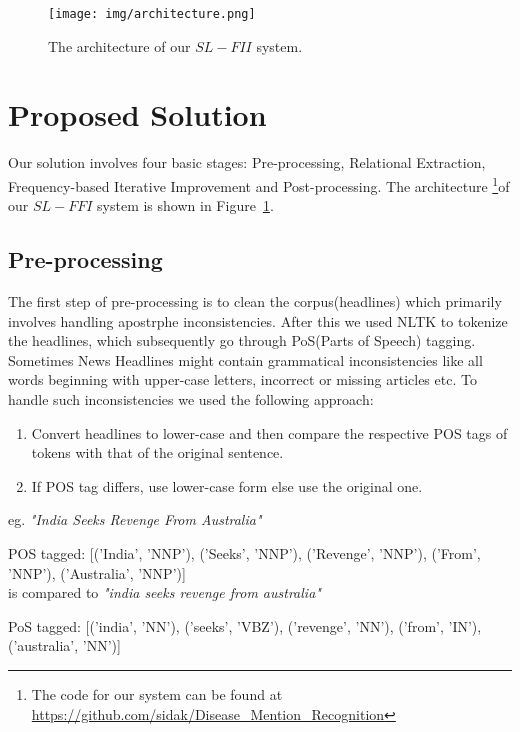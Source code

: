 \documentclass{article}
\begin{document}
\begin{figure}[t]
\centering
\texttt{[image: img/architecture.png]}
\caption{The architecture of our $SL-FII$ system.}
\label{fig:architecture}
\end{figure}


\section{Proposed Solution}

Our solution involves four basic stages: Pre-processing, Relational Extraction, Frequency-based Iterative Improvement and Post-processing. The architecture \footnote{The code for our system can be found at \\ \url{https://github.com/sidak/Disease_Mention_Recognition}}of our $SL-FFI$ system is shown in Figure~\ref{fig:architecture}. 

\subsection{Pre-processing}

The first step of pre-processing is to clean the corpus(headlines) which primarily involves handling apostrphe inconsistencies. After this we used NLTK to tokenize the headlines, which subsequently go through PoS(Parts of Speech) tagging. Sometimes News Headlines might contain grammatical inconsistencies like all words beginning with upper-case letters, incorrect or missing articles etc.  To handle such inconsistencies we used the following approach:
\begin{enumerate}

\item Convert headlines to lower-case and then compare the respective POS tags of tokens with that of the original sentence.

\item If POS tag differs, use lower-case form else use the original one.
\end{enumerate}

eg. \textit{"India Seeks Revenge From Australia"}

POS tagged: [('India', 'NNP'), ('Seeks', 'NNP'), ('Revenge', 'NNP'), ('From', 'NNP'), ('Australia', 'NNP')]\\

is compared to \textit{"india seeks revenge from australia"}

PoS tagged: [('india', 'NN'), ('seeks', 'VBZ'), ('revenge', 'NN'), ('from', 'IN'), ('australia', 'NN')]\\
\end{document}
